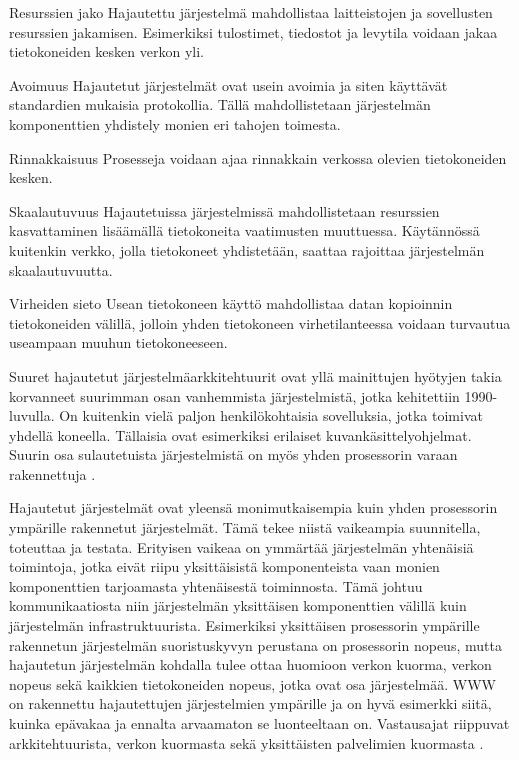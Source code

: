 \documentclass[utf8]{gradu3}
\begin{document}
\begin{desclist}
\item[Resurssien jako] Hajautettu järjestelmä mahdollistaa laitteistojen ja sovellusten resurssien jakamisen. Esimerkiksi tulostimet, tiedostot ja levytila voidaan jakaa tietokoneiden kesken verkon yli.
\item[Avoimuus] Hajautetut järjestelmät ovat usein avoimia ja siten käyttävät standardien mukaisia protokollia. Tällä mahdollistetaan järjestelmän komponenttien yhdistely monien eri tahojen toimesta. 
\item[Rinnakkaisuus] Prosesseja voidaan ajaa rinnakkain verkossa olevien tietokoneiden kesken.
\item[Skaalautuvuus] Hajautetuissa järjestelmissä mahdollistetaan resurssien kasvattaminen lisäämällä tietokoneita vaatimusten muuttuessa. Käytännössä kuitenkin verkko, jolla tietokoneet yhdistetään, saattaa rajoittaa järjestelmän skaalautuvuutta.
\item[Virheiden sieto] Usean tietokoneen käyttö mahdollistaa datan kopioinnin tietokoneiden välillä, jolloin yhden tietokoneen virhetilanteessa voidaan turvautua useampaan muuhun tietokoneeseen. 
\end{desclist}

Suuret hajautetut järjestelmäarkkitehtuurit ovat yllä mainittujen hyötyjen takia korvanneet suurimman osan vanhemmista järjestelmistä, jotka kehitettiin 1990-luvulla. On kuitenkin vielä paljon henkilökohtaisia sovelluksia, jotka toimivat yhdellä koneella. Tällaisia ovat esimerkiksi erilaiset kuvankäsittelyohjelmat. Suurin osa sulautetuista järjestelmistä on myös yhden prosessorin varaan rakennettuja \parencite[s. 480]{Sommerville}. 

Hajautetut järjestelmät ovat yleensä monimutkaisempia kuin yhden prosessorin ympärille rakennetut järjestelmät. Tämä tekee niistä vaikeampia suunnitella, toteuttaa ja testata. Erityisen vaikeaa on ymmärtää järjestelmän yhtenäisiä toimintoja, jotka eivät riipu yksittäisistä komponenteista vaan monien komponenttien tarjoamasta yhtenäisestä toiminnosta. Tämä johtuu kommunikaatiosta niin järjestelmän yksittäisen komponenttien välillä kuin järjestelmän infrastruktuurista. Esimerkiksi yksittäisen prosessorin ympärille rakennetun järjestelmän suoristuskyvyn perustana on prosessorin nopeus, mutta hajautetun järjestelmän kohdalla tulee ottaa huomioon verkon kuorma, verkon nopeus sekä kaikkien tietokoneiden nopeus, jotka ovat osa järjestelmää. WWW on rakennettu hajautettujen järjestelmien ympärille ja on hyvä esimerkki siitä, kuinka epävakaa ja ennalta arvaamaton se luonteeltaan on. Vastausajat riippuvat arkkitehtuurista, verkon kuormasta sekä yksittäisten palvelimien kuormasta \parencite[s. 481]{Sommerville}.  
\end{document}
